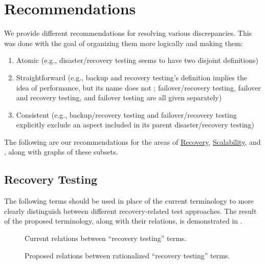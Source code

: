 \section{Recommendations}
\label{recs}

We provide different recommendations for resolving various
discrepancies. This was done with the goal of
organizing them more logically and making them:
\begin{enumerate}
    \item Atomic (e.g., disaster/recovery testing seems to have two
          disjoint definitions)
    \item Straightforward (e.g., backup and recovery testing's definition
          implies the idea of performance, but its name does not
          \ifnotpaper; failover/recovery testing, failover and recovery
          testing, and failover testing are all given separately\fi)
    \item Consistent (e.g., backup/recovery testing and failover/recovery
          testing explicitly exclude an aspect included in its parent
          disaster/recovery testing)
\end{enumerate}
The following are our recommendations for the areas of
\hyperref[rec-test-rec]{Recovery}, \hyperref[scal-test-rec]{Scalability}, and
, along with graphs of these subsets.

\subsection{Recovery Testing}
\label{rec-test-rec}
The following terms should be used in place of the current terminology to
more clearly distinguish between different recovery-related test approaches.
The result of the proposed terminology, along with their relations, is
demonstrated in .

\begin{figure}[bt!]
    \centering
    \begin{minipage}{.575\linewidth}
        \centering
        \recoveryGraphCurrent{}
        \caption{Current relations between ``recovery
            testing'' terms.}
        \label{fig:recovery-graph-current}
    \end{minipage}%
    \begin{minipage}{.425\linewidth}
        \centering
        \recoveryGraphProposed{}
        \caption{Proposed relations between
            rationalized ``recovery testing'' terms.}
        \label{fig:recovery-graph-proposed}
    \end{minipage}
\end{figure}

